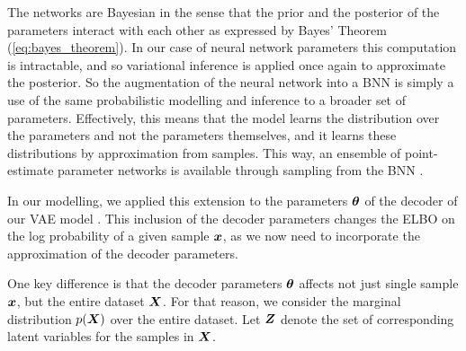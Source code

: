 The networks are Bayesian in the sense that the prior and the posterior of the parameters interact with each other as expressed by Bayes' Theorem (\ref{eq:bayes_theorem}). In our case of neural network parameters this computation is intractable, and so variational inference is applied once again to approximate the posterior. So the augmentation of the neural network into a BNN is simply a use of the same probabilistic modelling and inference to a broader set of parameters. Effectively, this means that the model learns the distribution over the parameters and not the parameters themselves, and it learns these distributions by approximation from samples. This way, an ensemble of point-estimate parameter networks is available through sampling from the BNN \cite{blundell2015weight}.

In our modelling, we applied this extension to the parameters $\bm{ \theta }$ of the decoder of our VAE model \cite[Appendix F]{kingma2013auto}. This inclusion of the decoder parameters changes the ELBO on the log probability of a given sample $\bm{ x }$, as we now need to incorporate the approximation of the decoder parameters.

One key difference is that the decoder parameters $\bm{ \theta }$ affects not just single sample $\bm{ x }$, but the entire dataset $\bm{ X }$. For that reason, we consider the marginal distribution $p(\bm{ X })$ over the entire dataset. Let $\bm{ Z }$ denote the set of corresponding latent variables for the samples in $\bm{ X }$. 

